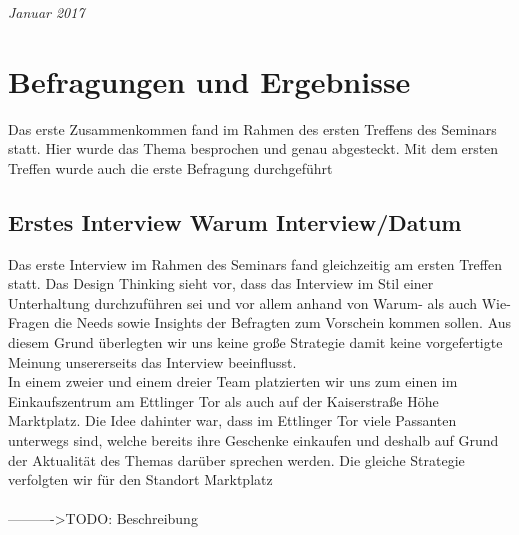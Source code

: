\documentclass[12pt,ngerman, fleqn]{book} %
\begin{document}
\noindent \textit{Januar 2017} %



\pagestyle{empty} %

\tableofcontents %

\tableoffigures

\pagestyle{fancy} %

\chapter{Befragungen und Ergebnisse}
Das erste Zusammenkommen fand im Rahmen des ersten Treffens des Seminars statt. Hier wurde das Thema besprochen und genau abgesteckt. Mit dem ersten Treffen wurde auch die erste Befragung durchgeführt

\section{Erstes Interview  Warum Interview/Datum}
Das erste Interview im Rahmen des Seminars fand gleichzeitig am ersten Treffen statt. Das Design Thinking sieht vor, dass das Interview im Stil einer Unterhaltung durchzuführen sei und vor allem anhand von Warum- als auch Wie-Fragen die Needs sowie Insights der Befragten zum Vorschein kommen sollen. Aus diesem Grund überlegten wir uns keine große Strategie damit keine vorgefertigte Meinung unsererseits das Interview beeinflusst.\\
In einem zweier und einem dreier Team platzierten wir uns zum einen im Einkaufszentrum am Ettlinger Tor als auch auf der Kaiserstraße Höhe Marktplatz. Die Idee dahinter war, dass im Ettlinger Tor viele Passanten unterwegs sind, welche bereits ihre Geschenke einkaufen und deshalb auf Grund der Aktualität des Themas darüber sprechen werden. Die gleiche Strategie verfolgten wir für den Standort Marktplatz \\\\---------->TODO: Beschreibung\\\\
\end{document}
